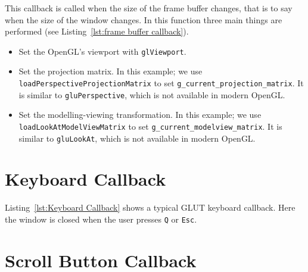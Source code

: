 \documentclass[11pt,oneside,a4paper,final]{article}
\begin{document}
This callback is called when the size of the frame buffer changes, that is to 
say when the size of the window changes. In this function three main things are 
performed (see Listing~\ref{lst:frame buffer callback}).
\begin{itemize}
 \item Set the OpenGL's viewport with \verb+glViewport+.
 
 \item Set the projection matrix. In this example; we use 
    \verb+loadPerspectiveProjectionMatrix+ to set 
    \verb+g_current_projection_matrix+. It is similar to \verb+gluPerspective+, 
    which is not available in modern OpenGL.
 
 \item Set the modelling-viewing transformation. In this example; we use 
    \verb+loadLookAtModelViewMatrix+ to set 
    \verb+g_current_modelview_matrix+. It is similar to \verb+gluLookAt+, 
    which is not available in modern OpenGL.
 
\end{itemize}

\begin{center}

\end{center}


\section{Keyboard Callback}
\label{sec:Keyboard Callback}

Listing~\ref{lst:Keyboard Callback} shows a typical GLUT keyboard callback. 
Here the window is closed when the user presses \verb+Q+ or \verb+Esc+.

\begin{center}

\end{center}


\section{Scroll Button Callback}
\label{sec:Scroll button callback}
\end{document}
